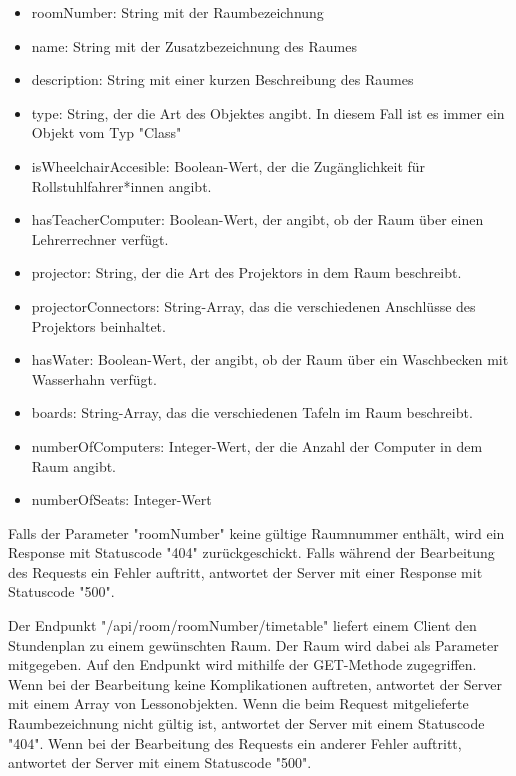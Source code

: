 \begin{itemize}
    \item roomNumber: String mit der Raumbezeichnung
    \item name: String mit der Zusatzbezeichnung des Raumes
    \item description: String mit einer kurzen Beschreibung des Raumes
    \item type: String, der die Art des Objektes angibt. In diesem Fall ist es immer ein Objekt vom Typ "Class"
    \item isWheelchairAccesible: Boolean-Wert, der die Zugänglichkeit für Rollstuhlfahrer*innen angibt.
    \item hasTeacherComputer: Boolean-Wert, der angibt, ob der Raum über einen Lehrerrechner verfügt.
    \item projector: String, der die Art des Projektors in dem Raum beschreibt.
    \item projectorConnectors: String-Array, das die verschiedenen Anschlüsse des Projektors beinhaltet.
    \item hasWater: Boolean-Wert, der angibt, ob der Raum über ein Waschbecken mit Wasserhahn verfügt. 
    \item boards: String-Array, das die verschiedenen Tafeln im Raum beschreibt.
    \item numberOfComputers: Integer-Wert, der die Anzahl der Computer in dem Raum angibt.
    \item numberOfSeats: Integer-Wert  
\end{itemize}

Falls der Parameter "roomNumber" keine gültige Raumnummer enthält, wird ein Response mit Statuscode "404" zurückgeschickt. 
Falls während der Bearbeitung des Requests ein Fehler auftritt, antwortet der Server mit einer Response mit Statuscode "500".


Der Endpunkt "/api/room/{roomNumber}/timetable" liefert einem Client den Stundenplan zu einem gewünschten Raum. Der Raum wird dabei als Parameter mitgegeben. Auf den Endpunkt wird mithilfe der GET-Methode zugegriffen. Wenn bei der Bearbeitung keine Komplikationen auftreten, antwortet der Server mit einem Array von Lessonobjekten. Wenn die beim Request mitgelieferte Raumbezeichnung nicht gültig ist, antwortet der Server mit einem Statuscode "404". Wenn bei der Bearbeitung des Requests ein anderer Fehler auftritt, antwortet der Server mit einem Statuscode "500".


